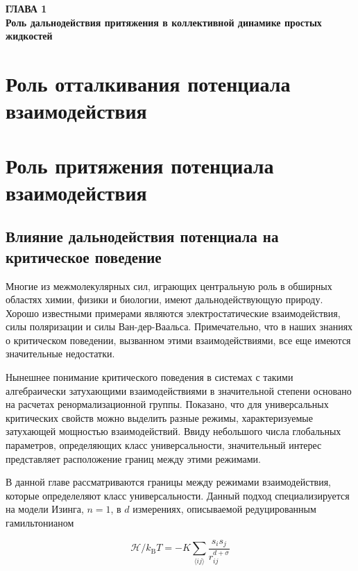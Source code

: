 
\newpage
\begin{center}
\textbf{\large ГЛАВА 1 \\ Роль дальнодействия притяжения в коллективной динамике простых жидкостей}
\end{center}



\section{Роль отталкивания потенциала взаимодействия}

\section{Роль притяжения потенциала взаимодействия}

\subsection{Влияние дальнодействия потенциала на критическое поведение}

Многие из межмолекулярных сил, играющих центральную роль в обширных областях химии, физики и биологии, имеют дальнодействующую природу.
Хорошо известными примерами являются электростатические взаимодействия, силы поляризации и силы Ван-дер-Ваальса.
Примечательно, что в наших знаниях о критическом поведении, вызванном этими взаимодействиями, все еще имеются значительные недостатки.

Нынешнее понимание критического поведения в системах с такими алгебраически затухающими взаимодействиями в значительной степени основано на расчетах ренормализационной группы.
Показано, что для универсальных критических свойств можно выделить разные режимы, характеризуемые затухающей мощностью взаимодействий.
Ввиду небольшого числа глобальных параметров, определяющих класс универсальности, значительный интерес представляет расположение границ между этими режимами.

В данной главе рассматриваются границы между режимами взаимодействия, которые определеляют класс универсальности. Данный подход специализируется на модели Изинга, $n = 1$, в $d$ измерениях, описываемой редуцированным гамильтонианом

\begin{equation}
\mathcal{H} / k_{\mathrm{B}} T=-K \sum_{\langle i j\rangle} \frac{s_{i} s_{j}}{r_{i j}^{d+\sigma}}
\end{equation}

